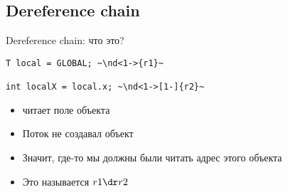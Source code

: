 %
\ifrender
\subsection{Dereference chain}
\begin{frame}[fragile]{Dereference chain: что это?}
%
\begin{center}
\begin{minipage}[3]{.5\linewidth}
	\begin{lstlisting}
T local = GLOBAL; ~\nd<1->{r1}~

int localX = local.x; ~\nd<1->[1-]{r2}~
	\end{lstlisting}
\end{minipage}
\end{center}


%

\begin{itemize}[<+->]
\item {} читает поле объекта
\item Поток не создавал объект
\item Значит, где-то мы должны были читать адрес этого объекта
\item Это называется $r1 \dr r2$
\end{itemize}


\end{frame}
\fi
